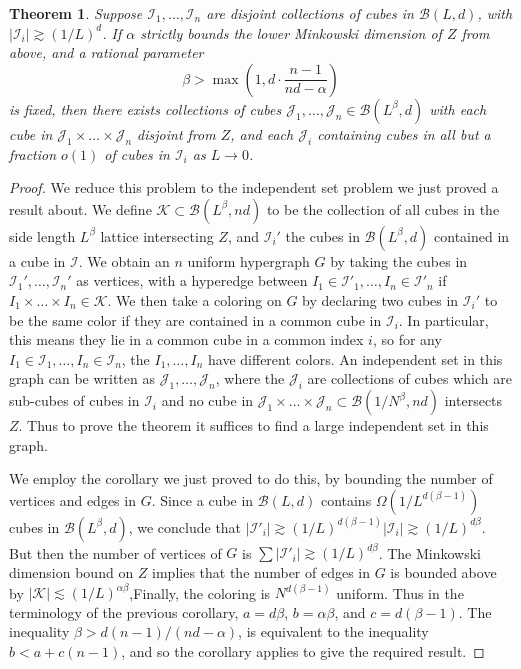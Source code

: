 \documentclass{article}
\theoremstyle{plain}
\theoremstyle{plain}
\newtheorem{theorem}{Theorem}
\begin{document}
\begin{multicols}{2}
\begin{theorem}
	Suppose $\mathcal{I}_1, \dots, \mathcal{I}_n$ are disjoint collections of cubes in $\mathcal{B}(L,d)$, with $|\mathcal{I}_i| \gtrsim (1/L)^d$. If $\alpha$ strictly bounds the lower Minkowski dimension of $Z$ from above, and a rational parameter
	\[ \beta > \max \left(1, d \cdot \frac{n-1}{nd-\alpha} \right) \]
	is fixed, then there exists collections of cubes $\mathcal{J}_1, \dots, \mathcal{J}_n \in \mathcal{B}(L^\beta,d)$ with each cube in $\mathcal{J}_1 \times \dots \times \mathcal{J}_n$ disjoint from $Z$, and each $\mathcal{J}_i$ containing cubes in all but a fraction $o(1)$ of cubes in $\mathcal{I}_i$ as $L \to 0$.
\end{theorem}
\begin{proof}
	We reduce this problem to the independent set problem we just proved a result about. We define $\mathcal{K} \subset \mathcal{B}(L^\beta,nd)$ to be the collection of all cubes in the side length $L^\beta$ lattice intersecting $Z$, and $\mathcal{I}_i'$ the cubes in $\mathcal{B}(L^\beta, d)$ contained in a cube in $\mathcal{I}$. We obtain an $n$ uniform hypergraph $G$ by taking the cubes in $\mathcal{I}_1', \dots, \mathcal{I}_n'$ as vertices, with a hyperedge between $I_1 \in \mathcal{I}'_1, \dots, I_n \in \mathcal{I}'_n$ if $I_1 \times \dots \times I_n \in \mathcal{K}$. We then take a coloring on $G$ by declaring two cubes in $\mathcal{I}_i'$ to be the same color if they are contained in a common cube in $\mathcal{I}_i$. In particular, this means they lie in a common cube in a common index $i$, so for any $I_1 \in \mathcal{I}_1, \dots, I_n \in \mathcal{I}_n$, the $I_1, \dots, I_n$ have different colors. An independent set in this graph can be written as $\mathcal{J}_1, \dots, \mathcal{J}_n$, where the $\mathcal{J}_i$ are collections of cubes which are sub-cubes of cubes in $\mathcal{I}_i$ and no cube in $\mathcal{J}_1 \times \dots \times \mathcal{J}_n \subset \mathcal{B}(1/N^\beta,nd)$ intersects $Z$. Thus to prove the theorem it suffices to find a large independent set in this graph.

	We employ the corollary we just proved to do this, by bounding the number of vertices and edges in $G$. Since a cube in $\mathcal{B}(L,d)$ contains $\Omega(1/L^{d(\beta-1)})$ cubes in $\mathcal{B}(L^\beta,d)$, we conclude that $|\mathcal{I}'_i| \gtrsim (1/L)^{d(\beta - 1)} |\mathcal{I}_i| \gtrsim (1/L)^{d \beta}$. But then the number of vertices of $G$ is $\sum |\mathcal{I}'_i| \gtrsim (1/L)^{d \beta}$. The Minkowski dimension bound on $Z$ implies that the number of edges in $G$ is bounded above by $|\mathcal{K}| \lesssim (1/L)^{\alpha \beta}$,Finally, the coloring is $N^{d(\beta - 1)}$ uniform. Thus in the terminology of the previous corollary, $a = d \beta$, $b = \alpha \beta$, and $c = d(\beta - 1)$. The inequality $\beta > d(n-1)/(nd - \alpha)$, is equivalent to the inequality $b < a + c(n-1)$, and so the corollary applies to give the required result.
\end{proof}


\end{multicols}
\end{document}
